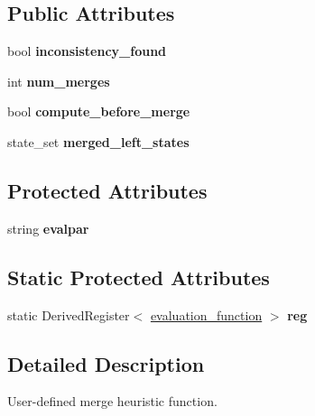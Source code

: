 \subsection*{Public Attributes}
\begin{DoxyCompactItemize}
\item 
\mbox{\label{classevaluation__function_a6631f0e603404c6c08c1a1fdd298932b}} 
bool {\bfseries inconsistency\+\_\+found}
\item 
\mbox{\label{classevaluation__function_a23fbdcc2f7a07e1d1428e61d5c5c267f}} 
int {\bfseries num\+\_\+merges}
\item 
\mbox{\label{classevaluation__function_a1954a2b161d4da6148e288cb38ac8b59}} 
bool {\bfseries compute\+\_\+before\+\_\+merge}
\item 
\mbox{\label{classevaluation__function_aff00baf1529b16519900b0f68afe8dad}} 
state\+\_\+set {\bfseries merged\+\_\+left\+\_\+states}
\end{DoxyCompactItemize}
\subsection*{Protected Attributes}
\begin{DoxyCompactItemize}
\item 
\mbox{\label{classevaluation__function_a72edf09c203d376a1525f3fd74f0a210}} 
string {\bfseries evalpar}
\end{DoxyCompactItemize}
\subsection*{Static Protected Attributes}
\begin{DoxyCompactItemize}
\item 
\mbox{\label{classevaluation__function_a254a3ccfbe2bdd5c9b84ad4e52599e50}} 
static Derived\+Register$<$ \hyperlink{classevaluation__function}{evaluation\+\_\+function} $>$ {\bfseries reg}
\end{DoxyCompactItemize}


\subsection{Detailed Description}
User-\/defined merge heuristic function. 


